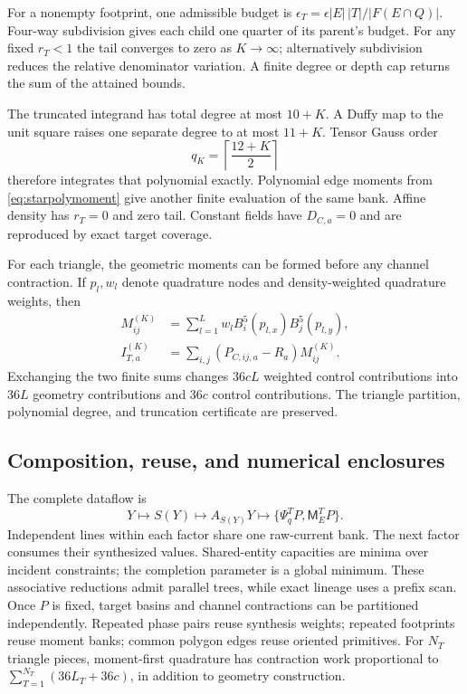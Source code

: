 For a nonempty footprint, one admissible budget is
$\epsilon_T=\epsilon|E|\,|T|/|F(E\cap Q)|$. Four-way subdivision gives each
child one quarter of its parent's budget. For any fixed $r_T<1$ the tail
converges to zero as $K\to\infty$; alternatively subdivision reduces the
relative denominator variation. A finite degree or depth cap returns the
sum of the attained bounds.

The truncated integrand has total degree at most $10+K$. A Duffy map to the
unit square raises one separate degree to at most $11+K$. Tensor Gauss order
\begin{equation}
 q_K=\left\lceil\frac{12+K}{2}\right\rceil
\end{equation}
therefore integrates that polynomial exactly. Polynomial edge moments from
\eqref{eq:starpolymoment} give another finite evaluation of the same bank.
Affine density has $r_T=0$ and zero tail. Constant fields have $D_{C,a}=0$
and are reproduced by exact target coverage.

For each triangle, the geometric moments can be formed before any channel
contraction. If $p_l,w_l$ denote quadrature nodes and density-weighted
quadrature weights, then
\begin{align}
 M_{ij}^{(K)}&=\sum_{l=1}^Lw_lB_i^5(p_{l,x})B_j^5(p_{l,y}),\nonumber\\
 I_{T,a}^{(K)}&=\sum_{i,j}(P_{C,ij,a}-R_a)M_{ij}^{(K)}.
 \label{eq:starintegratedpolyphase}
\end{align}
Exchanging the two finite sums changes $36cL$ weighted control contributions
into $36L$ geometry contributions and $36c$ control contributions. The
triangle partition, polynomial degree, and truncation certificate are
preserved.

\subsection{Composition, reuse, and numerical enclosures}
The complete dataflow is
\begin{equation}
 Y\longmapsto S(Y)\longmapsto A_{S(Y)}Y
 \longmapsto\{\Psi_q^TP,\mathsf M_E^TP\}.
\end{equation}
Independent lines within each factor share one raw-current bank. The next
factor consumes their synthesized values. Shared-entity capacities are
minima over incident constraints; the completion parameter is a global
minimum. These associative reductions admit parallel trees, while exact
lineage uses a prefix scan. Once $P$ is fixed, target basins and channel
contractions can be partitioned independently. Repeated phase pairs reuse
synthesis weights; repeated footprints reuse moment banks; common polygon
edges reuse oriented primitives. For $N_T$ triangle pieces, moment-first
quadrature has contraction work proportional to
$\sum_{T=1}^{N_T}(36L_T+36c)$, in addition to geometry construction.


